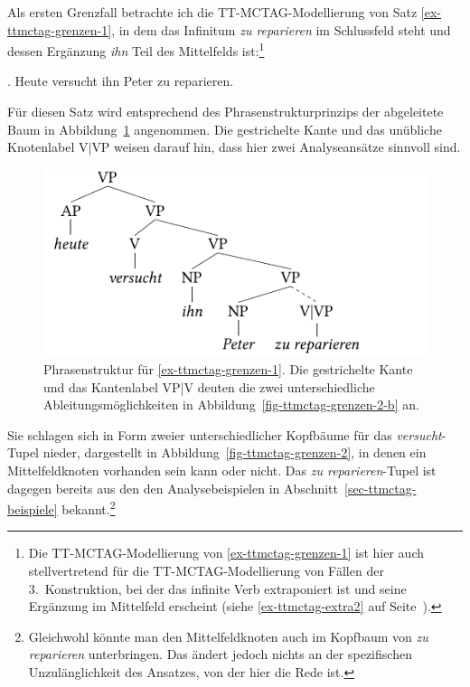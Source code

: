 Als ersten Grenzfall betrachte ich die TT-MCTAG-Modellierung von Satz \ref{ex-ttmctag-grenzen-1}, in dem das Infinitum {\it zu reparieren} im Schlussfeld steht und dessen Ergänzung {\it ihn} Teil des Mittelfelds ist:\footnote{Die TT-MCTAG-Modellierung von \ref{ex-ttmctag-grenzen-1} ist hier auch stellvertretend für die TT-MCTAG-Modellierung von Fällen der 3.~Konstruktion, bei der das infinite Verb extraponiert ist und seine Ergänzung im Mittelfeld erscheint (siehe \ref{ex-ttmctag-extra2} auf Seite~\pageref{ex-ttmctag-extra2}).} 

\ex. Heute versucht ihn Peter zu reparieren. \label{ex-ttmctag-grenzen-1}

Für diesen Satz wird entsprechend des Phrasenstrukturprinzips der abgeleitete Baum in Abbildung~\ref{fig-ttmctag-grenzen-1} angenommen. Die gestrichelte Kante und das unübliche Knotenlabel V$|$VP weisen darauf hin, dass hier zwei Analyseansätze sinnvoll sind. 
\begin{figure}[t]
\centering
\includegraphics{graphics/abb727.pdf}
\caption{\label{fig-ttmctag-grenzen-1}Phrasenstruktur für \ref{ex-ttmctag-grenzen-1}. Die gestrichelte Kante und das Kantenlabel VP|V deuten die zwei unterschiedliche Ableitungsmöglichkeiten in Abbildung~\ref{fig-ttmctag-grenzen-2-b} an.}
\end{figure} 
Sie schlagen sich in Form zweier unterschiedlicher Kopfbäume für das {\it versucht}-Tupel nieder, dargestellt in Abbildung~\ref{fig-ttmctag-grenzen-2}, in denen ein Mittelfeldknoten vorhanden sein kann oder nicht. Das {\it zu reparieren}-Tupel ist dagegen bereits aus den den Analysebeispielen in Abschnitt~\ref{sec-ttmctag-beispiele} bekannt.\footnote{Gleichwohl könnte man den Mittelfeldknoten auch im Kopfbaum von {\it zu reparieren} unterbringen. Das ändert jedoch nichts an der spezifischen Unzulänglichkeit des Ansatzes, von der hier die Rede ist.}     
